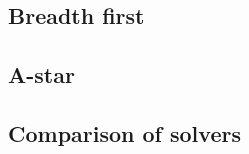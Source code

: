 \documentclass[../../main.tex]{subfiles}
\begin{document}
\subsection{Breadth first}%
\label{sub:breadth_first}




\subsection{A-star}%
\label{sub:a_star}



\subsection{Comparison of solvers}%
\label{sub:comparison_of_solvers}




	
\end{document}
